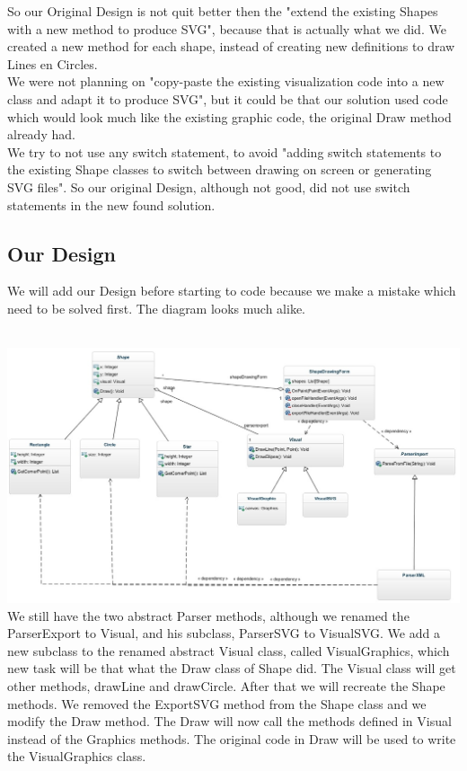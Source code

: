 \documentclass[a4paper,12pt]{article}
\begin{document}

So our Original Design is not quit better then the "extend the existing Shapes with a new method to produce SVG", because that is actually what we did. We created a new method for each shape, instead of creating new definitions to draw Lines en Circles.
\\
We were not planning on "copy-paste the existing visualization code into a new class and adapt it to produce SVG", but it could be that our solution used code which would look much like the existing graphic code, the original Draw method already had. 
\\
We try to not use any switch statement, to avoid "adding switch statements to the existing Shape classes to switch between drawing on screen or generating SVG files". So our original Design, although not good, did not use switch statements in the new found solution.


\subsection{Our Design}
We will add our Design before starting to code because we make a mistake which need to be solved first. The diagram looks much alike.

\\
\includegraphics[scale=0.5]{diagramFinal.jpg}
\\

We still have the two abstract Parser methods, although we renamed the ParserExport to Visual, and his subclass, ParserSVG to VisualSVG. We add a new subclass to the renamed abstract Visual class, called VisualGraphics, which new task will be that what the Draw class of Shape did. The Visual class will get other methods, drawLine and drawCircle. After that we will recreate the Shape methods. We removed the ExportSVG method from the Shape class and we modify the Draw method. The Draw will now call the methods defined in Visual instead of the Graphics methods. The original code in Draw will be used to write the VisualGraphics class.
\\
\end{document}
